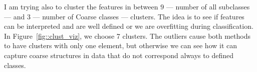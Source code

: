 \documentclass[a4paper, 11pt]{article}
\begin{document}
	I am trying also to cluster the features in between $9$ --- number of all subclasses --- and $3$ --- number of Coarse classes --- clusters. The idea is to see if features can be interpreted and are well defined or we are overfitting during classification. In Figure~\ref{fig::clust_viz}, we choose 7 clusters. The outliers cause both methods to have clusters with only one element, but otherwise we can see how it can capture coarse structures in data that do not correspond always to defined classes.

	\begin{figure}[H]
\end{figure}
\end{document}
